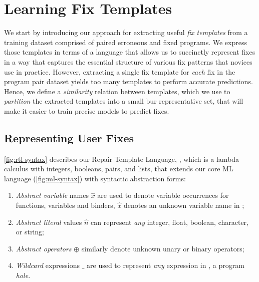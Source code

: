 \section{Learning Fix Templates}
\label{sec:templ-partition}

We start by introducing our approach for extracting useful \emph{fix templates}
from a training dataset comprised of paired erroneous and fixed programs.
%
We express those templates in terms of a language that allows us to succinctly
represent fixes in a way that captures the essential structure of various fix
patterns that novices use in practice.
%
However, extracting a single fix template for \emph{each} fix in the program
pair dataset yields too many templates to perform accurate predictions.
%
Hence, we define a \emph{similarity} relation between templates, which we use to
\emph{partition} the extracted templates into a small bur representative set,
that will make it easier to train precise models to predict fixes.



\subsection{Representing User Fixes}
\label{sec:templ-partition:lang}

\autoref{fig:rtl-syntax} describes our Repair Template Language, \repairLang,
which is a lambda calculus with integers, booleans, pairs, and lists, that
extends our core ML language \lang (\autoref{fig:ml-syntax}) with
syntactic abstraction forms:

\begin{enumerate}
    \item \emph{Abstract variable} names $\hat{x}$  are used to denote variable
    occurrences for functions, variables and binders, \ie $\hat{x}$ denotes
    an unknown variable name in \repairLang;

    \item \emph{Abstract literal} values $\hat{n}$ can represent \emph{any}
    integer, float, boolean, character, or string;

    \item \emph{Abstract operators} $\oplus$ similarly denote unknown unary or
    binary operators;

    \item \emph{Wildcard} expressions $\_$ are used to represent \emph{any}
    expression in \repairLang, \ie a program \emph{hole}.
\end{enumerate}


